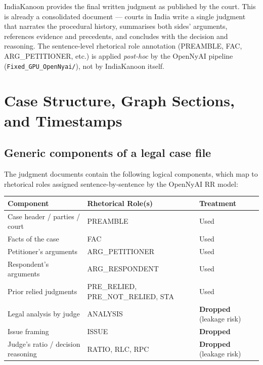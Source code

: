 \documentclass[12pt,a4paper]{article}
\begin{document}
IndiaKanoon provides the final written judgment as published by the court. This is already a consolidated document — courts in India write a single judgment that narrates the procedural history, summarises both sides' arguments, references evidence and precedents, and concludes with the decision and reasoning. The sentence-level rhetorical role annotation (PREAMBLE, FAC, ARG\_PETITIONER, etc.) is applied \textit{post-hoc} by the OpenNyAI pipeline (\texttt{Fixed\_GPU\_\allowbreak OpenNyai/}), not by IndiaKanoon itself.

\section{Case Structure, Graph Sections, and Timestamps}

\subsection{Generic components of a legal case file}

The judgment documents contain the following logical components, which map to rhetorical roles assigned sentence-by-sentence by the OpenNyAI RR model:

\begin{center}
\begin{tabularx}{\textwidth}{>{\raggedright\arraybackslash}p{4.5cm} >{\raggedright\arraybackslash}X >{\raggedright\arraybackslash}p{3.5cm}}
\toprule
\textbf{Component} & \textbf{Rhetorical Role(s)} & \textbf{Treatment} \\
\midrule
Case header / parties / court & PREAMBLE & Used \\
Facts of the case & FAC & Used \\
Petitioner's arguments & ARG\_PETITIONER & Used \\
Respondent's arguments & ARG\_RESPONDENT & Used \\
Prior relied judgments & PRE\_RELIED, PRE\_NOT\_RELIED, STA & Used \\
Legal analysis by judge & ANALYSIS & \textbf{Dropped} (leakage risk) \\
Issue framing & ISSUE & \textbf{Dropped} \\
Judge's ratio / decision reasoning & RATIO, RLC, RPC & \textbf{Dropped} (leakage risk) \\
\bottomrule
\end{tabularx}
\end{center}
\end{document}
